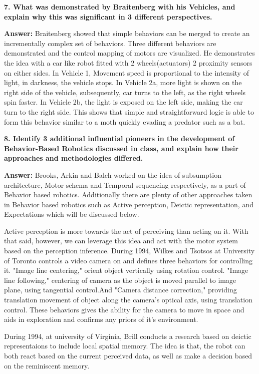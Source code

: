 \documentclass[a4paper, 10pt]{article}
\begin{document}
\hfill

\textbf{7. What was demonstrated by Braitenberg with his Vehicles, and explain why this was significant in 3 different  perspectives.}

\textbf{Answer:} 
Braitenberg showed that simple behaviors can be merged to create an incrementally complex set of behaviors. Three different behaviors are demonstrated and the control mapping of motors are visualized. He demonstrates the idea with a car like robot fitted with 2 wheels(actuators) 2 proximity sensors on either sides. In Vehicle 1, Movement speed is proportional to the intensity of light, in darkness, the vehicle stops. In Vehicle 2a, more light is shown on the right side of the vehicle, subsequently, car turns to the left, as the right wheels spin faster. In Vehicle 2b, the light is exposed on the left side, making the car turn to the right side. This shows that simple and straightforward logic is able to form this behavior similar to a moth quickly evading a predator such as a bat.

\hfill

\textbf{8. Identify 3 additional influential pioneers in the development of Behavior-Based Robotics discussed in class, and explain how their approaches and methodologies differed.}

\textbf{Answer:} 
Brooks, Arkin and Balch worked on the idea of subsumption architecture, Motor schema and Temporal sequencing respectively, as a part of Behavior based robotics. Additionally there are plenty of other approaches taken in Behavior based robotics such as Active perception, Deictic representation, and Expectations which will be discussed below.

Active perception is more towards the act of perceiving than acting on it. With that said, however, we can leverage this idea and act with the motor system based on the perception inference. During 1994, Wilkes and Tsotsos at University of Toronto controls a video camera on and defines three behaviors for controlling it. "Image line centering," orient object vertically using rotation control. "Image line following," centering of camera as the object is moved parallel to image plane, using tangential control.And "Camera distance correction," providing translation movement of object along the camera's optical axis, using translation control. These behaviors gives the ability for the camera to move in space and aids in exploration and confirms any priors of it's environment.

During 1994, at university of Virginia, Brill conducts a research based on deictic representaions to include local spatial memory. The idea is that, the robot can both react based on the current perceived data, as well as make a decision based on the reminiscent memory. 
\end{document}

